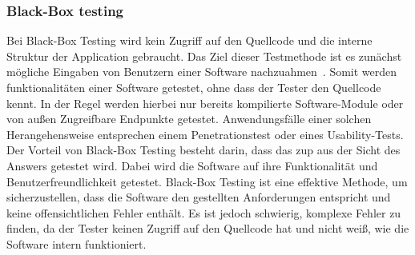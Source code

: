 \subsubsection{Black-Box testing}\label{subsubsec:black-box-testing}
Bei Black-Box Testing wird kein Zugriff auf den Quellcode und die interne Struktur der Application gebraucht.
Das Ziel dieser Testmethode ist es zunächst mögliche Eingaben von Benutzern einer Software nachzuahmen~\cite{black-box-testing}.
Somit werden funktionalitäten einer Software getestet, ohne dass der Tester den Quellcode kennt.
In der Regel werden hierbei nur bereits kompilierte Software-Module oder von außen Zugreifbare Endpunkte getestet.
Anwendungsfälle einer solchen Herangehensweise entsprechen einem Penetrationstest oder eines Usability-Tests.
Der Vorteil von Black-Box Testing besteht darin, dass das \gls{zup} aus der Sicht des Answers getestet wird.
Dabei wird die Software auf ihre Funktionalität und Benutzerfreundlichkeit getestet.
\newline
Black-Box Testing ist eine effektive Methode, um sicherzustellen, dass die Software den gestellten Anforderungen
entspricht und keine offensichtlichen Fehler enthält.
Es ist jedoch schwierig, komplexe Fehler zu finden, da der Tester keinen Zugriff auf den Quellcode hat und nicht weiß,
wie die Software intern funktioniert.
